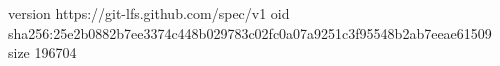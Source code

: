 version https://git-lfs.github.com/spec/v1
oid sha256:25e2b0882b7ee3374c448b029783c02fc0a07a9251c3f95548b2ab7eeae61509
size 196704
